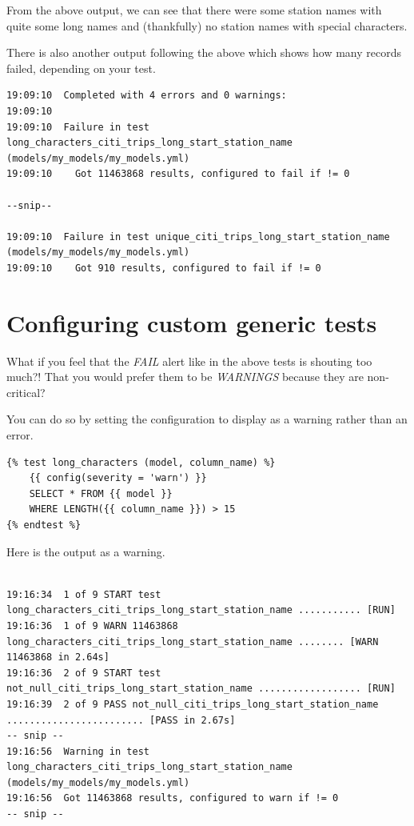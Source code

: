 \documentclass[
]{book}
\begin{document}
From the above output, we can see that there were some station names with quite some long names and (thankfully) no station names with special characters.

There is also another output following the above which shows how many records failed, depending on your test.

\begin{verbatim}
19:09:10  Completed with 4 errors and 0 warnings:
19:09:10  
19:09:10  Failure in test long_characters_citi_trips_long_start_station_name (models/my_models/my_models.yml)
19:09:10    Got 11463868 results, configured to fail if != 0
 
--snip--

19:09:10  Failure in test unique_citi_trips_long_start_station_name (models/my_models/my_models.yml)
19:09:10    Got 910 results, configured to fail if != 0
\end{verbatim}

\hypertarget{configuring-custom-generic-tests}{%
\section{Configuring custom generic tests}\label{configuring-custom-generic-tests}}

What if you feel that the \emph{FAIL} alert like in the above tests is shouting too much?! That you would prefer them to be \emph{WARNINGS} because they are non-critical?

You can do so by setting the configuration to display as a warning rather than an error.

\begin{verbatim}
{% test long_characters (model, column_name) %}
    {{ config(severity = 'warn') }}
    SELECT * FROM {{ model }}
    WHERE LENGTH({{ column_name }}) > 15 
{% endtest %}
\end{verbatim}

Here is the output as a warning.

\begin{verbatim}

19:16:34  1 of 9 START test long_characters_citi_trips_long_start_station_name ........... [RUN]
19:16:36  1 of 9 WARN 11463868 long_characters_citi_trips_long_start_station_name ........ [WARN 11463868 in 2.64s]
19:16:36  2 of 9 START test not_null_citi_trips_long_start_station_name .................. [RUN]
19:16:39  2 of 9 PASS not_null_citi_trips_long_start_station_name ........................ [PASS in 2.67s]
-- snip --
19:16:56  Warning in test long_characters_citi_trips_long_start_station_name (models/my_models/my_models.yml)
19:16:56  Got 11463868 results, configured to warn if != 0
-- snip --
\end{verbatim}
\end{document}
